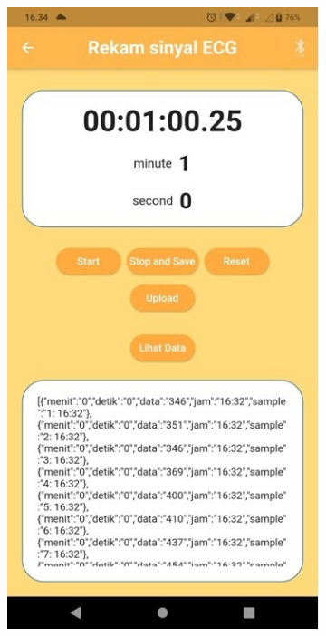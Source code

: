 \begin{figure}[H] \centering
	\begin{subfigure}{0.45\textwidth}
		\centering
		\includegraphics[width=1\linewidth]{img/percob/Slide14a}	  
		\caption{}		
	\end{subfigure}

\end{figure}
